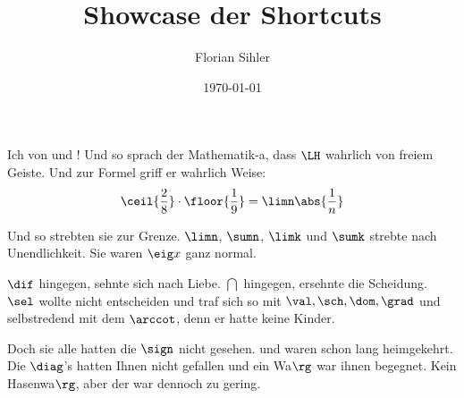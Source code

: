 \documentclass{article}
\title{Showcase der Shortcuts}
\author{Florian Sihler}
\date{\today}
\begin{document}
\maketitle

\begin{ltxshow}
Ich  von \obda und \Obda! Und so sprach der Mathematik-a, dass \(\LH\) wahrlich von freiem Geiste.
Und zur Formel griff er wahrlich Weise:
\begin{equation*}
    \ceil{\frac{2}{8}} \cdot \floor{\frac{1}{9}} = \limn\abs{\frac{1}{n}}
\end{equation*}
\end{ltxshow}

\begin{ltxshow}
    Und so strebten sie zur Grenze. \(\limn\), \(\sumn\), \(\limk\) und \(\sumk\) strebte nach Unendlichkeit. Sie waren \(\eig x\) ganz normal.

    \(\dif\) hingegen, sehnte sich nach Liebe. \(\dint\) hingegen, ersehnte die Scheidung.
    \(\sel\) wollte nicht entscheiden und traf sich so mit \(\val, \sch, \dom, \grad\) und selbstredend mit dem \(\arccot\), 
    denn er hatte keine Kinder.
\end{ltxshow}

\begin{ltxshow}
    Doch sie alle hatten die \(\sign\) nicht gesehen. \Im und \Re waren schon lang heimgekehrt. 
    Die \(\diag\)'s hatten Ihnen nicht gefallen und ein Wa\(\rg\) war ihnen begegnet. Kein Hasenwa\(\rg\),
    aber der  war dennoch zu gering.
\end{ltxshow}
\end{document}
